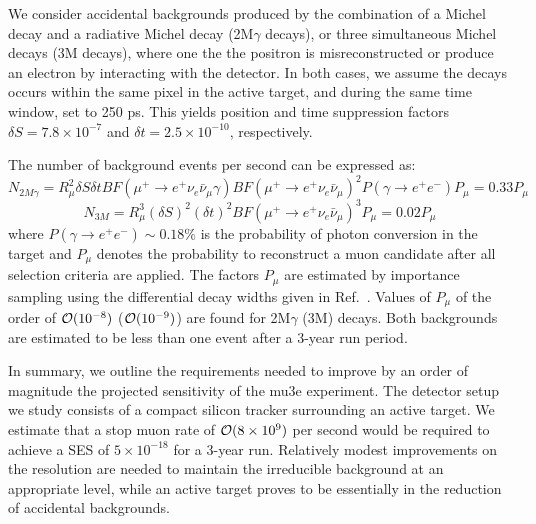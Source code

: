 We consider accidental backgrounds produced by the combination of a Michel decay and a radiative Michel decay (2M$\gamma$ decays), or three simultaneous Michel decays (3M decays), where one the the positron is misreconstructed or produce an electron by interacting with the detector. In both cases, we assume 
the decays occurs within the same pixel in the active target, and during the same time window, set to 250 ps. This yields position and time suppression factors $\delta S = 7.8\times 10^{-7}$ and $\delta t = 2.5\times 10^{-10}$, respectively. 

The number of background events per second can be expressed as:
%
$$N_{2M\gamma} = R_\mu^2 \delta S \delta t BF(\mu^+ \rightarrow e^+ \nu_e \bar\nu_\mu \gamma) BF(\mu^+ \rightarrow e^+ \nu_e \bar\nu_\mu)^2 P(\gamma \rightarrow e^+ e^-)  P_\mu  = 0.33 P_\mu$$
$$N_{3M} = R_\mu^3(\delta S)^2 (\delta t)^2 BF(\mu^+ \rightarrow e^+ \nu_e \bar\nu_\mu)^3 P_\mu = 0.02 P_\mu$$
%
where $P(\gamma \rightarrow e^+ e^-)\sim 0.18\%$ is the probability of photon conversion in the target and $P_\mu$ denotes the probability to reconstruct a muon candidate after all selection criteria are applied. The factors $P_\mu$ are estimated by importance sampling using the differential decay widths given in Ref.~\cite{Kuno:1999jp,Djilkibaev:2008jy}. Values of $P_\mu$ of the order of ${\cal O}(10^{-8})$ (${\cal O}(10^{-9})$) are found for 2M$\gamma$ (3M) decays. Both backgrounds are estimated to be less than one event after a 3-year run period.


In summary, we outline the requirements needed to improve by an order of magnitude the projected sensitivity of the mu3e experiment. The detector setup we study consists of a compact silicon tracker surrounding an active target. We estimate that a stop muon rate of ${\cal O}(8\times 10^{9})$ per second would be required to achieve a SES of $5\times 10^{-18}$ for a 3-year run. Relatively modest improvements on the resolution are needed to maintain the irreducible background at an appropriate level, while an active target proves to be essentially in the reduction of accidental backgrounds. 


